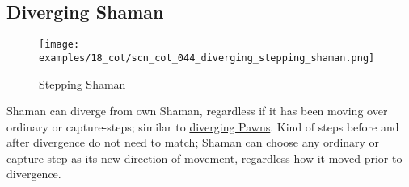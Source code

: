 \clearpage %

\subsection*{Diverging Shaman}
\label{sec:Conquest of Tlalocan/Shaman/Movement/Diverging Shaman}




\vspace*{-0.7\baselineskip}
\noindent
\begin{wrapfigure}[10]{l}{0.4\textwidth}
\centering
\texttt{[image: examples/18\_cot/scn\_cot\_044\_diverging\_stepping\_shaman.png]}
\vspace*{-0.4\baselineskip}
\caption{Stepping Shaman}
\label{fig:scn_cot_044_diverging_stepping_shaman}
\end{wrapfigure}
Shaman can diverge from own Shaman, regardless if it has been moving over ordinary
or capture-steps; similar to
\hyperref[fig:scn_cot_034_diverging_pawn_init]{diverging Pawns}. \newline
\indent
Kind of steps before and after divergence do not need to match; Shaman can choose
any ordinary or capture-step as its new direction of movement, regardless how it
moved prior to divergence.

